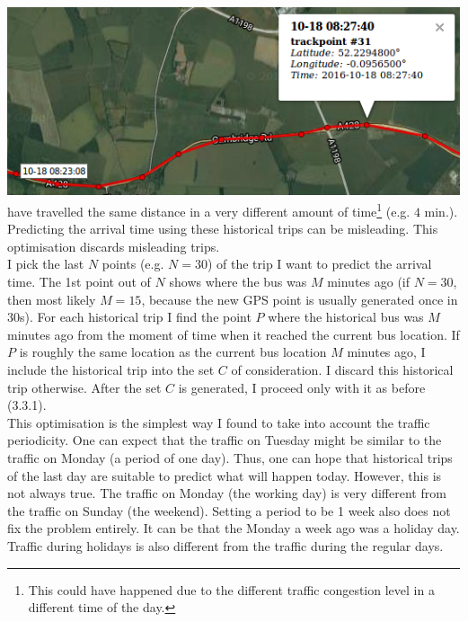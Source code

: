 \documentclass[12pt,a4paper,oneside,openright]{report}
\begin{document}
\includegraphics[scale = 0.7]{figs/inaccurate_historical.png} \\

have travelled the same distance in a very different amount of 
time\footnote{This could have happened due to the different traffic congestion level
in a different time of the day.} (e.g. $4$ min.). Predicting the arrival time using
these historical trips can be misleading. This optimisation discards misleading
trips. \\

I pick the last $N$ points (e.g. $N = 30$) of the trip I want to predict the arrival
time. The 1st point out of $N$ shows where the bus was $M$ minutes ago (if $N=30$, then
most likely $M=15$, because the new GPS point is usually generated once in 30s).
For each historical trip I find the point $P$ where the historical bus was $M$ minutes
ago from the moment of time when it reached the current bus location. If $P$ is roughly
the same location as the current bus location $M$ minutes ago, I include the historical
trip into the set $C$ of consideration. I discard this historical trip otherwise.
After the set $C$ is generated, I proceed only with it as before (3.3.1). \\

This optimisation is the simplest way I found to take into account the traffic
periodicity. One can expect that the traffic on Tuesday might be similar to the
traffic on Monday (a period of one day). Thus, one can hope that historical trips
of the last day are suitable to predict what will happen today. However,
this is not always true. The traffic on Monday (the working day) is very different
from the traffic on Sunday (the weekend). Setting a period to be 1 week also does not
fix the problem entirely. It can be that the Monday a week ago was a holiday day.
Traffic during holidays is also different from the traffic during the regular days. \\
\end{document}
